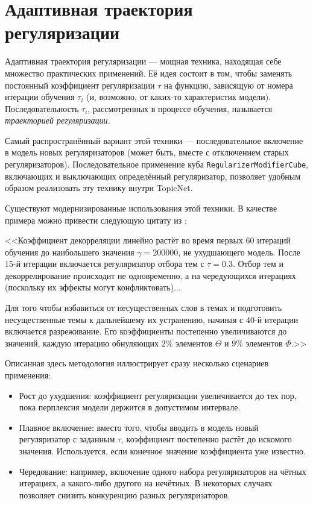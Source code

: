 \section{Адаптивная траектория регуляризации}



Адаптивная траектория регуляризации --- мощная техника, находящая себе множество практических применений. Её идея состоит в том, чтобы заменять постоянный коэффициент регуляризации $\tau$ на функцию, зависящую от номера итерации обучения $\tau_i$ (и, возможно, от каких-то характеристик модели). Последовательность $\tau_i$, рассмотренных в процессе обучения, называется \textit{траекторией регуляризации}.  

Самый распространённый вариант этой техники --- последовательное включение в модель новых регуляризаторов (может быть, вместе с отключением старых регуляризаторов). Последовательное применение куба \texttt{RegularizerModifierCube}, включающих и выключающих определённый регуляризатор, позволяет удобным образом реализовать эту технику внутри TopicNet.  

Существуют модернизированные использования этой техники. В качестве примера можно привести следующую цитату из \cite{voron15plavin}: 

<<Коэффициент декорреляции линейно растёт во время первых 60 итераций обучения до наибольшего значения $\gamma = 200000$, не ухудшающего модель. После 15-й итерации включается регуляризатор отбора тем с $\tau=0.3$. Отбор тем и декоррелирование происходит не одновременно, а на чередующихся итерациях (поскольку их эффекты могут конфликтовать)...  

Для того чтобы избавиться от несущественных слов в темах и подготовить несущественные темы к дальнейшему их устранению, начиная с 40-й итерации включается разреживание. Его коэффициенты постепенно увеличиваются до значений, каждую итерацию обнуляющих $2\%$ элементов $\Theta$ и $9\%$ элементов $\Phi$.>> 

Описанная здесь методология иллюстрирует сразу несколько сценариев применения: 

\begin{itemize}
    \item Рост до ухудшения: коэффициент регуляризации увеличивается до тех пор, пока перплексия модели держится в допустимом интервале.
    \item Плавное включение: вместо того, чтобы вводить в модель новый регуляризатор с заданным $\tau$, коэффициент постепенно растёт до искомого значения. Используется, если конечное значение коэффициента уже известно.
    \item Чередование: например, включение одного набора регуляризаторов на чётных итерациях, а какого-либо другого на нечётных. В некоторых случаях позволяет снизить конкуренцию разных регуляризаторов.
\end{itemize} 

